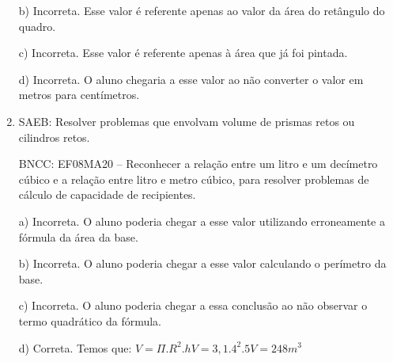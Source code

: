 \begin{enumerate}
b) Incorreta. Esse valor é referente apenas ao valor da área do
retângulo do quadro.

c) Incorreta. Esse valor é referente apenas à área que já foi
pintada.

d) Incorreta. O aluno chegaria a esse valor ao não converter o valor
em metros para centímetros.
\item SAEB: Resolver problemas que envolvam volume de prismas retos ou
cilindros retos.

BNCC: EF08MA20 -- Reconhecer a relação entre um litro e um decímetro
cúbico e a relação entre litro e metro cúbico, para resolver problemas
de cálculo de capacidade de recipientes.

a) Incorreta. O aluno poderia chegar a esse valor utilizando
erroneamente a fórmula da área da base.

b) Incorreta. O aluno poderia chegar a esse valor calculando o
perímetro da base.

c) Incorreta. O aluno poderia chegar a essa conclusão ao não
observar o termo quadrático da fórmula.

d) Correta. Temos que:
$V= \Pi. R^2 . h

V= 3,1 . 4^2 . 5

V= 248 m^3$
\end{enumerate}


